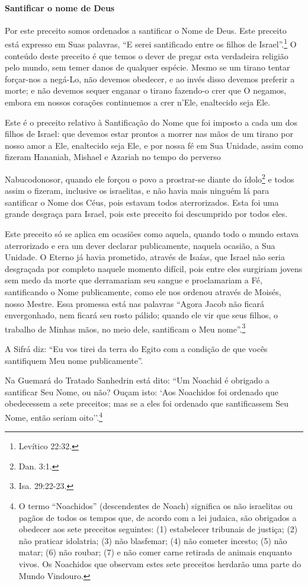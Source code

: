 \paragraph{Santificar o nome de Deus}

Por este preceito somos ordenados a santificar o Nome de Deus. Este
preceito está expresso em Suas palavras, ``E serei santificado entre os
filhos de Israel''.\footnote{Levítico 22:32.} O conteúdo deste preceito é que
temos o dever de pregar esta verdadeira religião pelo mundo, sem temer
danos de qualquer espécie. Mesmo se um tirano tentar forçar-nos a
negá-Lo, não devemos obedecer, e ao invés disso devemos preferir a
morte; e não devemos sequer enganar o tirano fazendo-o crer que O
negamos, embora em nossos corações continuemos a crer n'Ele, enaltecido
seja Ele.

Este é o preceito relativo à Santificação do Nome que foi imposto a cada
um dos filhos de Israel: que devemos estar prontos a morrer nas mãos de
um tirano por nosso amor a Ele, enaltecido seja Ele, e por nossa fé em
Sua Unidade, assim como fizeram Hananiah\starr, Mishael\starr{} e Azariah\starr{} no tempo do
perverso

Nabucodonosor, quando ele forçou o povo a prostrar-se diante do
ídolo\footnote{Dan. 3:1.} e todos assim o fizeram, inclusive os
israelitas, e não havia mais ninguém lá para santificar o Nome dos
Céus, pois estavam todos aterrorizados. Esta foi uma grande desgraça
para Israel, pois este preceito foi descumprido por todos eles.

Este preceito só se aplica em ocasiões como aquela, quando todo
o mundo estava aterrorizado e era um dever declarar publicamente,
naquela ocasião, a Sua Unidade. O Eterno já havia prometido, através de
Isaías, que Israel não seria desgraçada por completo naquele momento
difícil, pois entre eles surgiriam jovens sem medo da morte que
derramariam seu sangue e proclamariam a Fé, santificando o Nome
publicamente, como ele nos ordenou através
de Moisés, nosso Mestre. Essa promessa está nas palavras ``Agora Jacob\starr{}
não ficará envergonhado, nem ficará seu rosto pálido; quando ele vir que seus
filhos, o
trabalho de Minhas mãos, no meio dele, santificam o Meu
nome''.\footnote{Isa. 29:22-23.}

A Sifrá\starr{} diz: ``Eu vos tirei da terra do Egito com a condição de que
vocês santifiquem Meu nome publicamente''.

Na Guemará do Tratado Sanhedrin\starr{} está dito: ``Um Noachid\starr{} é obrigado a
santificar Seu Nome, ou não? Ouçam isto: `Aos Noachidos\starr{} foi ordenado que obedecessem a sete preceitos; mas se a eles foi ordenado que
santificassem Seu Nome, então seriam oito''.\footnote{O termo ``Noachidos'' (descendentes de Noach) significa os não
israelitas ou pagãos de todos os tempos que, de acordo com a lei
judaica, são obrigados a obedecer aos sete preceitos seguintes:
(1) estabelecer tribunais de justiça; (2) não praticar idolatria;
(3) não blasfemar; (4) não cometer incesto; (5) não matar;
(6) não roubar; (7) e não comer carne retirada de animais enquanto vivos. Os Noachidos que observam estes sete preceitos herdarão uma parte do Mundo Vindouro.}

